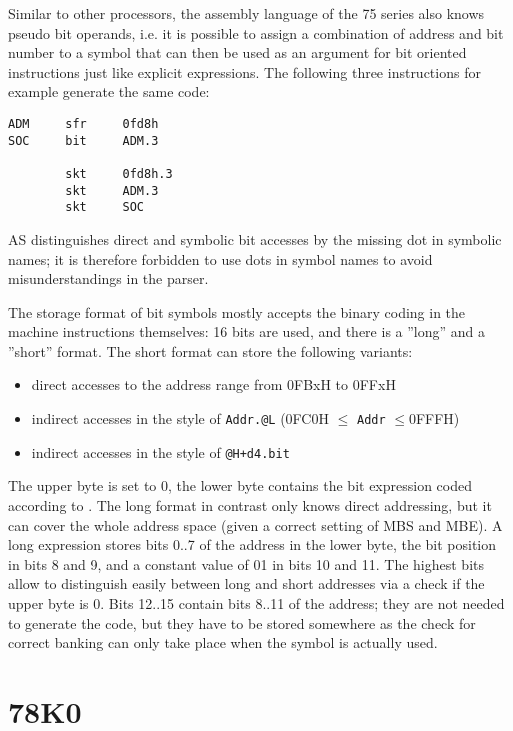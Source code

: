 \documentclass[12pt,twoside]{report}
\newcommand{\tty}[1]{{\tt #1}}
\begin{document}
Similar to other processors, the assembly language of the 75 series
also knows pseudo bit operands, i.e. it is possible to assign a
combination of address and bit number to a symbol that can then be
used as an argument for bit oriented instructions just like explicit
expressions.  The following three instructions for example generate
the same code:
\begin{verbatim}
ADM     sfr     0fd8h
SOC     bit     ADM.3

        skt     0fd8h.3
        skt     ADM.3
        skt     SOC
\end{verbatim}
AS distinguishes direct and symbolic bit accesses by the missing dot
in symbolic names; it is therefore forbidden to use dots in symbol
names to avoid misunderstandings in the parser.

The storage format of bit symbols mostly accepts the binary coding in
the machine instructions themselves:  16 bits are used, and there is
a ''long'' and a ''short'' format.  The short format can store the
following variants:
\begin{itemize}
\item{direct accesses to the address range from 0FBxH to 0FFxH}
\item{indirect accesses in the style of \tty{Addr.@L} (0FC0H $\leq$ \tty{Addr} $\leq$0FFFH)}
\item{indirect accesses in the style of \tty{@H+d4.bit}}
\end{itemize}
The upper byte is set to 0, the lower byte contains the bit
expression coded according to \cite{NEC75}.  The long format in contrast
only knows direct addressing, but it can cover the whole address space
(given a correct setting of MBS and MBE).  A long expression stores
bits 0..7 of the address in the lower byte, the bit position in bits
8 and 9, and a constant value of 01 in bits 10 and 11.  The highest
bits allow to distinguish easily between long and short addresses via
a check if the upper byte is 0.  Bits 12..15 contain bits 8..11 of
the address; they are not needed to generate the code, but they have
to be stored somewhere as the check for correct banking can only
take place when the symbol is actually used.


\section{78K0}
\label{78K0Spec}
\end{document}
